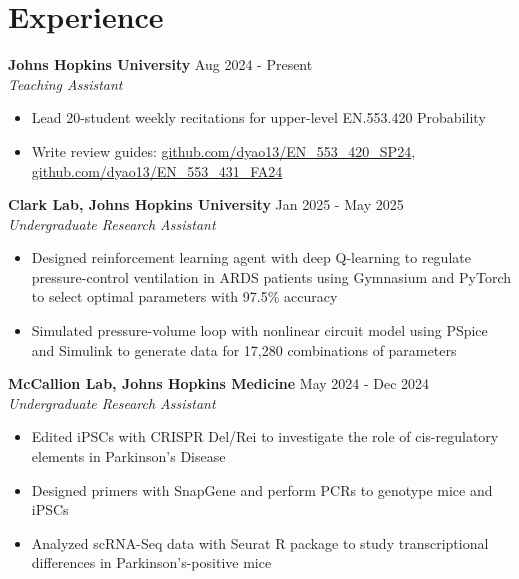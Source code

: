 \documentclass[11pt]{article}       %
\begin{document}
\vspace{-9pt}

\section*{Experience}
\textbf{Johns Hopkins University} \hfill Aug 2024 - Present \\
\textit{Teaching Assistant} \vspace{-9pt} \\
\begin{itemize}
  \item Lead 20-student weekly recitations for upper-level EN.553.420 Probability
  \item Write review guides: \href{https://github.com/dyao13/EN_553_420_SP24}{github.com/dyao13/EN\_553\_420\_SP24}, \href{https://github.com/dyao13/EN_553_431_FA24}{github.com/dyao13/EN\_553\_431\_FA24}
\end{itemize}

\textbf{Clark Lab, Johns Hopkins University} \hfill Jan 2025 - May 2025 \\
\textit{Undergraduate Research Assistant} \vspace{-9pt} \\
\begin{itemize}
  \item Designed reinforcement learning agent with deep Q-learning to regulate pressure-control ventilation in ARDS patients using Gymnasium and PyTorch to select optimal parameters with 97.5\% accuracy
  \item Simulated pressure-volume loop with nonlinear circuit model using PSpice and Simulink to generate data for 17,280 combinations of parameters
\end{itemize}

\textbf{McCallion Lab, Johns Hopkins Medicine} \hfill May 2024 - Dec 2024 \\
\textit{Undergraduate Research Assistant} \vspace{-9pt} \\
\begin{itemize}
  \item Edited iPSCs with CRISPR Del/Rei to investigate the role of cis-regulatory elements in Parkinson's Disease
  \item Designed primers with SnapGene and perform PCRs to genotype mice and iPSCs
  \item Analyzed scRNA-Seq data with Seurat R package to study transcriptional differences in Parkinson's-positive mice
\end{itemize}
\end{document}
